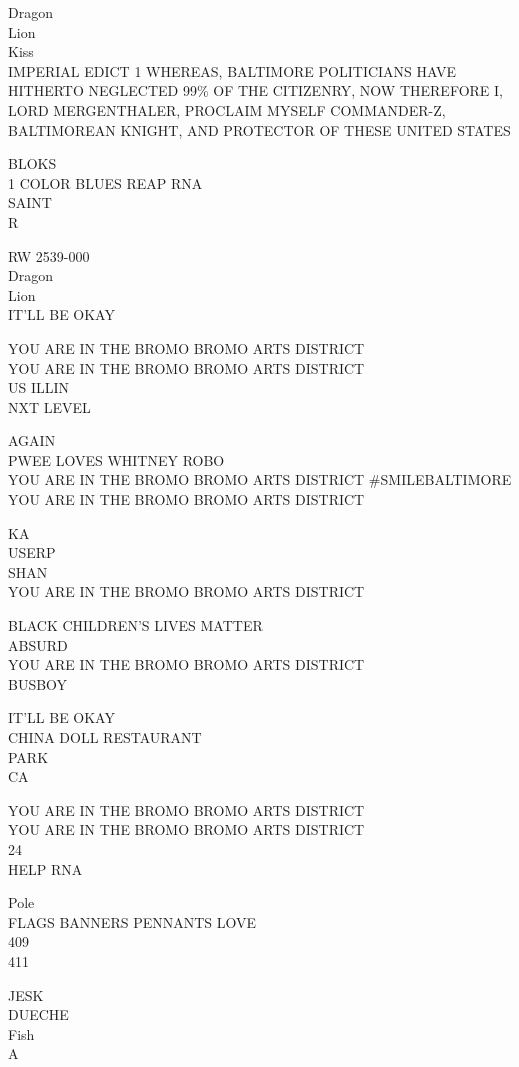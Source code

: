 \documentclass[10pt,letterpaper]{article}
\begin{document}
Dragon\\
Lion\\
Kiss\\
IMPERIAL EDICT 1 WHEREAS, BALTIMORE POLITICIANS HAVE HITHERTO NEGLECTED 99\% OF THE CITIZENRY, NOW THEREFORE I, LORD MERGENTHALER, PROCLAIM MYSELF COMMANDER{-}Z, BALTIMOREAN KNIGHT, AND PROTECTOR OF THESE UNITED STATES

BLOKS\\
1 COLOR BLUES REAP RNA\\
SAINT\\
R

RW 2539{-}000\\
Dragon\\
Lion\\
IT'LL BE OKAY

YOU ARE IN THE BROMO BROMO ARTS DISTRICT\\
YOU ARE IN THE BROMO BROMO ARTS DISTRICT\\
US ILLIN\\
NXT LEVEL

AGAIN\\
PWEE LOVES WHITNEY ROBO\\
YOU ARE IN THE BROMO BROMO ARTS DISTRICT \#SMILEBALTIMORE\\
YOU ARE IN THE BROMO BROMO ARTS DISTRICT

KA\\
USERP\\
SHAN\\
YOU ARE IN THE BROMO BROMO ARTS DISTRICT

BLACK CHILDREN'S LIVES MATTER\\
ABSURD\\
YOU ARE IN THE BROMO BROMO ARTS DISTRICT\\
BUSBOY

IT'LL BE OKAY\\
CHINA DOLL RESTAURANT\\
PARK\\
CA

YOU ARE IN THE BROMO BROMO ARTS DISTRICT\\
YOU ARE IN THE BROMO BROMO ARTS DISTRICT\\
24\\
HELP RNA

Pole\\
FLAGS BANNERS PENNANTS LOVE\\
409\\
411

JESK\\
DUECHE\\
Fish\\
A
\end{document}
